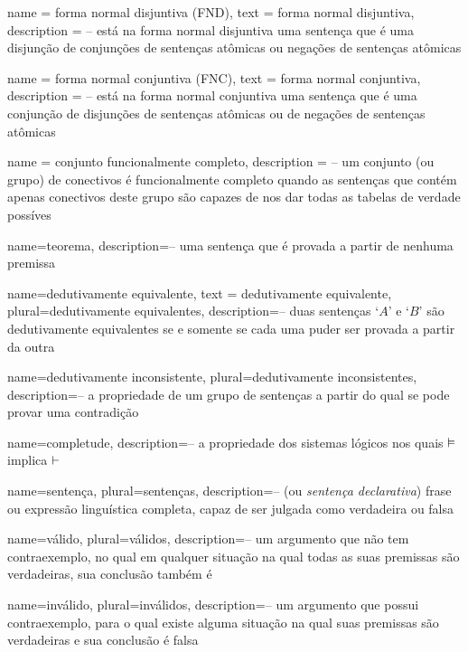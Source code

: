 {
 name = forma normal disjuntiva (FND),
 text = forma normal disjuntiva,
 description = {-- está na forma normal disjuntiva uma sentença que é uma disjunção de conjunções de sentenças atômicas ou negações de sentenças atômicas}
}

{
 name = forma normal conjuntiva (FNC),
 text = forma normal conjuntiva,
 description = {-- está na forma normal conjuntiva uma sentença que é uma conjunção de disjunções de sentenças atômicas ou de negações de sentenças atômicas}
}

{
 name = conjunto funcionalmente completo,
 description = {-- um conjunto (ou grupo) de conectivos é funcionalmente completo quando as sentenças que contém apenas conectivos deste grupo são capazes de nos dar todas as tabelas de verdade possíves}
}

{
 name=teorema,
 description={-- uma sentença que é provada a partir de nenhuma premissa}
}

{
 name=dedutivamente equivalente,
 text = dedutivamente equivalente,
 plural=dedutivamente equivalentes,
 description={-- duas sentenças `$A$' e `$B$' são  dedutivamente equivalentes se e somente se cada uma puder ser provada a partir da outra}
}

{
 name={dedutivamente inconsistente}, 
 plural={dedutivamente inconsistentes},
 description={-- a propriedade de um grupo de sentenças a partir do qual se pode provar uma contradição}
}

{
 name=completude,
 description={-- a propriedade dos sistemas lógicos nos quais $\vDash $ implica $\vdash$}
}

{
 name=sentença,
 plural=sentenças,
 description={-- (ou \textit{sentença declarativa}) frase ou expressão linguística completa, capaz de ser julgada como verdadeira ou falsa}
}

{
 name=válido,
 plural=válidos,
 description={-- um argumento que não tem contraexemplo, no qual em qualquer situação na qual todas as suas premissas são verdadeiras, sua conclusão também é}
}

{
 name=inválido,
 plural=inválidos,
 description={-- um argumento que possui contraexemplo, para o qual existe alguma situação na qual suas premissas são verdadeiras e sua conclusão é falsa}
}

